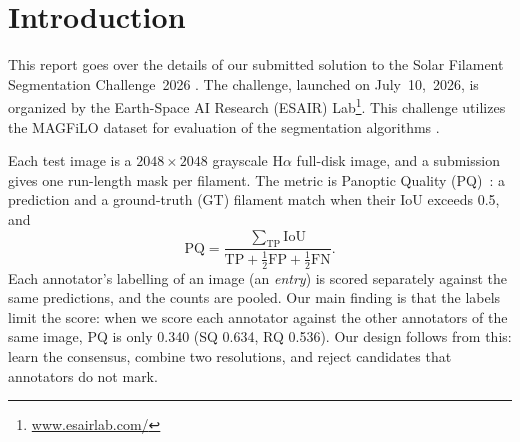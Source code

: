 \documentclass[sigconf]{acmart}
\begin{document}


\section{Introduction}
    This report goes over the details of our submitted solution to the Solar Filament Segmentation Challenge~2026 \cite{filament-segmentation-2026}. The challenge, launched on July~10,~2026, is organized by the Earth-Space AI Research (ESAIR) Lab\footnote{\href{https://www.esairlab.com/home}{www.esairlab.com/}}. This challenge utilizes the MAGFiLO dataset for evaluation of the segmentation algorithms \cite{ahmadzadeh2024dataset}. 

Each test image is a $2048\times2048$ grayscale H$\alpha$ full-disk image, and a submission
gives one run-length mask per filament. The metric is Panoptic Quality
(PQ)~\cite{kirillov2019panoptic}: a prediction and a ground-truth (GT) filament match when
their IoU exceeds 0.5, and
\[
\mathrm{PQ}=\frac{\sum_{\mathrm{TP}}\mathrm{IoU}}{\mathrm{TP}+\tfrac12\mathrm{FP}+\tfrac12\mathrm{FN}}.
\]
Each annotator's labelling of an image (an \emph{entry}) is scored separately against the same
predictions, and the counts are pooled. Our main finding is that the labels limit the score:
when we score each annotator against the other annotators of the same image, PQ is only 0.340
(SQ 0.634, RQ 0.536). Our design follows from this: learn the consensus, combine two
resolutions, and reject candidates that annotators do not mark.
\end{document}
